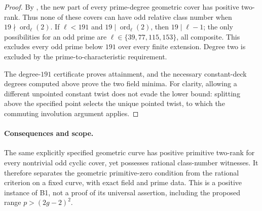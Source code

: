 \begin{proof}
By , the new part of every prime-degree
geometric cover has positive two-rank. Thus none of these
covers can have odd relative class number when
$19\nmid\operatorname{ord}_\ell(2)$. If $\ell<191$ and
$19\mid\operatorname{ord}_\ell(2)$, then $19\mid\ell-1$;
the only possibilities for an odd prime are
$\ell\in\{39,77,115,153\}$, all composite. This excludes every
odd prime below $191$ over every finite extension. Degree two
is excluded by the prime-to-characteristic requirement.

The degree-$191$ certificate proves attainment, and the necessary
constant-deck degrees computed above prove the two field minima.
For clarity, allowing a different unpointed constant twist does
not evade the lower bound: splitting above the specified point
selects the unique pointed twist, to which the commuting
involution argument applies.
\end{proof}

\paragraph{Consequences and scope.}
The same explicitly specified geometric curve has positive primitive
two-rank for every nontrivial odd cyclic cover, yet possesses rational
class-number witnesses. It therefore separates the geometric
primitive-zero condition from the rational criterion on a fixed
curve, with exact field and prime data. This is a positive instance
of B1, not a proof of its universal assertion, including the proposed
range $p>(2g-2)^2$.
